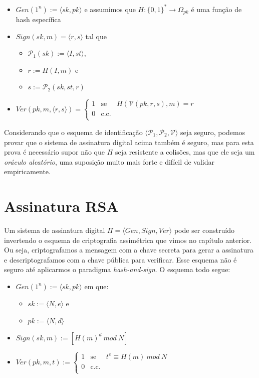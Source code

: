 \begin{itemize}
\item $Gen(1^n) := \langle sk, pk \rangle$ e assumimos que $H: \{0,1\}^* \to \Omega_{pk}$ é uma função de hash específica
\item $Sign(sk, m) = \langle r, s \rangle$ tal que
\begin{itemize}
\item $\mathcal{P}_1(sk) := \langle I, st \rangle$,
\item $r := H(I, m)$ e
\item $s := \mathcal{P}_2(sk, st, r)$
\end{itemize}
\item $Ver(pk, m, \langle r, s \rangle) = \left\{
    \begin{array}{lcl}
      1 & \textrm{se} & H(\mathcal{V}(pk, r, s), m) = r\\
      0 & \textrm{c.c.} &\\
    \end{array}
    \right.$
\end{itemize}

Considerando que o esquema de identificação $\langle \mathcal{P}_1, \mathcal{P}_2, \mathcal{V} \rangle$ seja seguro, podemos provar que o sistema de assinatura digital acima também é seguro, mas para esta prova é necessário supor não que $H$ seja resistente a colisões, mas que ele seja um {\em oráculo aleatório}, uma suposição muito mais forte e difícil de validar empiricamente.


\section{Assinatura RSA}
\label{sec:assinatura-rsa}

Um sistema de assinatura digital $\Pi = \langle Gen, Sign, Ver \rangle$ pode ser construído invertendo o esquema de criptografia assimétrica que vimos no capítulo anterior.
Ou seja, criptografamos a mensagem com a chave secreta para gerar a assinatura e descriptografamos com a chave pública para verificar.
Esse esquema não é seguro até aplicarmos o paradigma {\em hash-and-sign}.
O esquema todo segue:
\begin{itemize}
\item $Gen(1^n) := \langle sk, pk \rangle$ em que:
\begin{itemize}
\item $sk := \langle N, e \rangle$ e
\item $pk := \langle N, d \rangle$
\end{itemize}
\item $Sign(sk, m) := [H(m)^d\ mod\ N]$
\item $Ver(pk, m, t) := \left\{
    \begin{array}{lcl}
      1 & \textrm{se} & t^e \equiv H(m)\ mod\ N\\
      0 & \textrm{c.c.} &\\
    \end{array}
    \right.$
\end{itemize}

